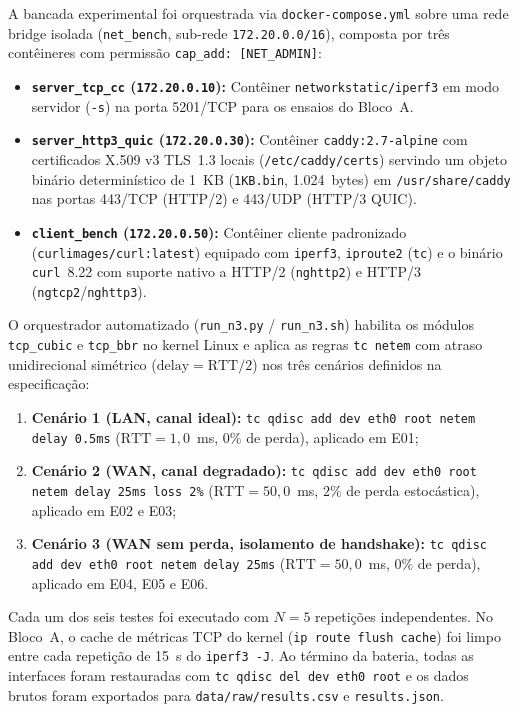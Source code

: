 \documentclass[12pt]{article}
\begin{document}
A bancada experimental foi orquestrada via \texttt{docker-compose.yml} sobre uma rede bridge isolada (\texttt{net\_bench}, sub-rede \texttt{172.20.0.0/16}), composta por três contêineres com permissão \texttt{cap\_add: [NET\_ADMIN]}:
\begin{itemize}
  \item \textbf{\texttt{server\_tcp\_cc} (\texttt{172.20.0.10}):} Contêiner \texttt{networkstatic/iperf3} em modo servidor (\texttt{-s}) na porta 5201/TCP para os ensaios do Bloco~A.
  \item \textbf{\texttt{server\_http3\_quic} (\texttt{172.20.0.30}):} Contêiner \texttt{caddy:2.7-alpine} com certificados X.509 v3 TLS~1.3 locais (\texttt{/etc/caddy/certs}) servindo um objeto binário determinístico de 1~KB (\texttt{1KB.bin}, 1.024~bytes) em \texttt{/usr/share/caddy} nas portas 443/TCP (HTTP/2) e 443/UDP (HTTP/3 QUIC).
  \item \textbf{\texttt{client\_bench} (\texttt{172.20.0.50}):} Contêiner cliente padronizado (\texttt{curlimages/curl:latest}) equipado com \texttt{iperf3}, \texttt{iproute2} (\texttt{tc}) e o binário \texttt{curl}~8.22 com suporte nativo a HTTP/2 (\texttt{nghttp2}) e HTTP/3 (\texttt{ngtcp2}/\texttt{nghttp3}).
\end{itemize}

O orquestrador automatizado (\texttt{run\_n3.py} / \texttt{run\_n3.sh}) habilita os módulos \texttt{tcp\_cubic} e \texttt{tcp\_bbr} no kernel Linux e aplica as regras \texttt{tc netem} com atraso unidirecional simétrico ($\text{delay} = \text{RTT}/2$) nos três cenários definidos na especificação:
\begin{enumerate}
  \item \textbf{Cenário 1 (LAN, canal ideal):} \texttt{tc qdisc add dev eth0 root netem delay 0.5ms} ($\text{RTT} = 1{,}0$~ms, $0\%$ de perda), aplicado em E01;
  \item \textbf{Cenário 2 (WAN, canal degradado):} \texttt{tc qdisc add dev eth0 root netem delay 25ms loss 2\%} ($\text{RTT} = 50{,}0$~ms, $2\%$ de perda estocástica), aplicado em E02 e E03;
  \item \textbf{Cenário 3 (WAN sem perda, isolamento de handshake):} \texttt{tc qdisc add dev eth0 root netem delay 25ms} ($\text{RTT} = 50{,}0$~ms, $0\%$ de perda), aplicado em E04, E05 e E06.
\end{enumerate}

Cada um dos seis testes foi executado com $N = 5$ repetições independentes. No Bloco~A, o cache de métricas TCP do kernel (\texttt{ip route flush cache}) foi limpo entre cada repetição de 15~s do \texttt{iperf3 -J}. Ao término da bateria, todas as interfaces foram restauradas com \texttt{tc qdisc del dev eth0 root} e os dados brutos foram exportados para \texttt{data/raw/results.csv} e \texttt{results.json}.
\end{document}
